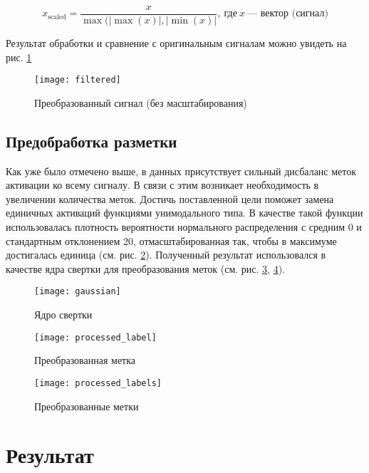 \begin{equation} \label{eq:scaling}
	x_{\text{scaled}} = \frac{x}{\max(|\max(x)|, |\min(x)|}, \: \text{где} \: x \: \text{--- вектор (сигнал)}
\end{equation}

\noindent Результат обработки и сравнение с оригинальным сигналам можно увидеть
на рис. \ref{fig:filtered}

\begin{figure}[!htb]
	\centering
	\texttt{[image: filtered]}
	\caption{Преобразованный сигнал (без масштабирования)}
	\label{fig:filtered}
\end{figure}

\subsection{Предобработка разметки}

Как уже было отмечено выше, в данных присутствует сильный дисбаланс меток
активации ко всему сигналу. В связи с этим возникает необходимость в увеличении
количества меток. Достичь поставленной цели поможет замена единичных активаций
функциями унимодального типа. В качестве такой функции использовалась плотность
вероятности нормального распределения с средним 0 и стандартным отклонением 20,
отмасштабированная так, чтобы в максимуме достигалась единица (см. рис.
\ref{fig:gaussian}). Полученный результат использовался в качестве ядра свертки
для преобразования меток (см. рис. \ref{fig:processed-label},
\ref{fig:processed-labels}).


\begin{figure}[!htb]
	\centering
	\texttt{[image: gaussian]}
	\caption{Ядро свертки}
	\label{fig:gaussian}
\end{figure}

\begin{figure}[!htb]
	\centering
	\texttt{[image: processed\_label]}
	\caption{Преобразованная метка}
	\label{fig:processed-label}
\end{figure}

\begin{figure}[!htb]
	\centering
	\texttt{[image: processed\_labels]}
	\caption{Преобразованные метки}
	\label{fig:processed-labels}
\end{figure}


\section{Результат}

